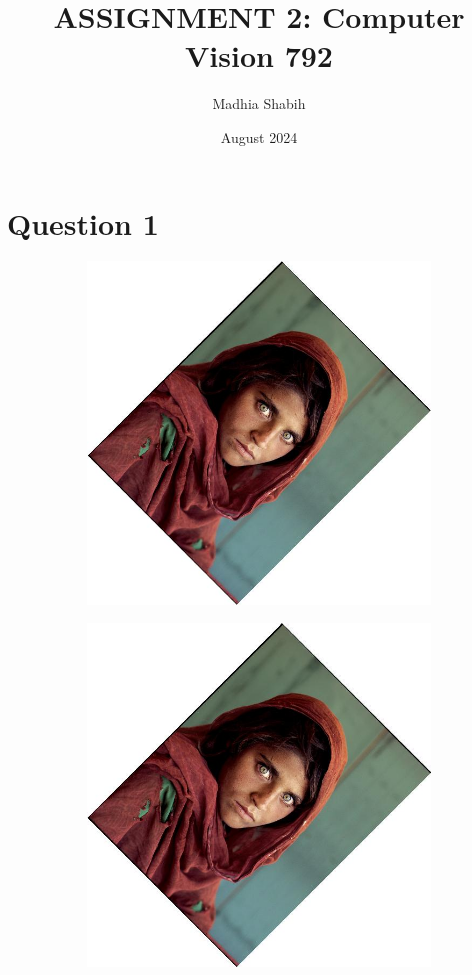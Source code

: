 \documentclass{article}
\title{ASSIGNMENT 2: Computer Vision 792}
\author{Madhia Shabih}
\date{August 2024}
\begin{document}
\maketitle
\section{Question 1}
\begin{figure}[H]
    \centering
    \begin{subfigure}{.3\textwidth}
        \centering
        \includegraphics[scale=0.04]{q1/output/similar_0.5_0.5_2.jpg}
        \subcaption{}
    \end{subfigure}
    \begin{subfigure}{.3\textwidth}
        \centering
        \includegraphics[scale=0.04]{q1/output/similar_0.5_1_2.jpg}

\end{subfigure}
\end{figure}
\end{document}
